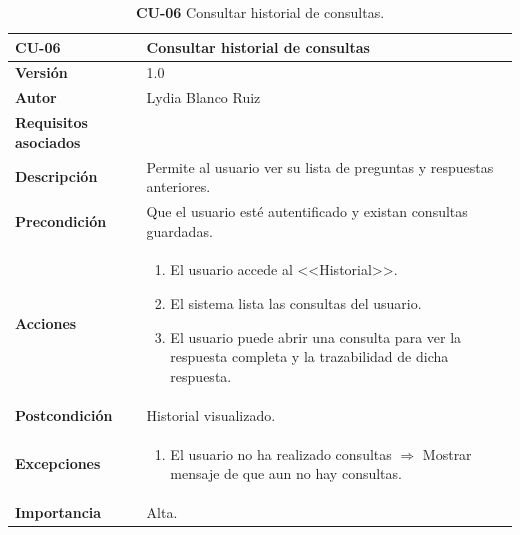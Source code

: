 \begin{table}[p]
	\centering
	\begin{tabularx}{\linewidth}{ p{} p{} }
		\toprule
		\textbf{\textbf{CU-06}}    & \textbf{Consultar historial de consultas}\\
		\toprule
		\textbf{Versión}              & 1.0    \\
		\textbf{Autor}                & Lydia Blanco Ruiz \\
		\textbf{Requisitos asociados} & {RF-11.1} \\
		\textbf{Descripción}          & Permite al usuario ver su lista de preguntas y respuestas anteriores. \\
		\textbf{Precondición}         & Que el usuario esté autentificado y existan consultas guardadas. \\
		\textbf{Acciones}             &
		\begin{enumerate}
			\def\labelenumi{\arabic{enumi}.}
			\tightlist
			\item El usuario accede al <<Historial>>.
			\item El sistema lista las consultas del usuario.
			\item El usuario puede abrir una consulta para ver la respuesta completa y la trazabilidad de dicha respuesta.
		\end{enumerate}\\
		\textbf{Postcondición}        & Historial visualizado. \\
		\textbf{Excepciones}          & 
		\begin{enumerate}
			\def\labelenumi{\arabic{enumi}.}
			\tightlist
			\item El usuario no ha realizado consultas $\Rightarrow$ Mostrar mensaje de que aun no hay consultas. 	
		\end{enumerate}\\
		\textbf{Importancia}          & Alta.  \\
		\bottomrule
	\end{tabularx}
	\caption{\textbf{CU-06} Consultar historial de consultas.}
	\label{req-06}
\end{table}

